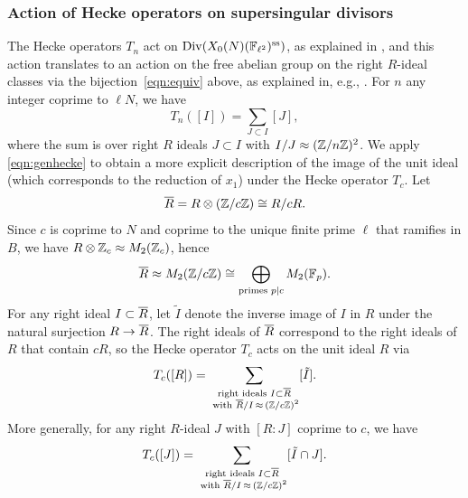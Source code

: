 \documentclass{article} \usepackage[active]{srcltx}
\DeclareMathOperator{\supersingular}{ss}
\renewcommand{\ss}{\supersingular}
\begin{document}
\subsubsection{Action of Hecke operators on supersingular divisors}\label{sec:heckeaction}
The Hecke operators $T_n$ act on $\Div(X_0(N)(\F_{\ell^2})^{\ss})$, as
explained in \cite[pg.~443--445]{ribet:modreps}, and this action
translates to an action on the free abelian group on the
right $R$-ideal classes via the bijection~\eqref{eqn:equiv} above, as
explained in, e.g., \cite[\S3.2]{kohel:hecke}.  For $n$
any integer coprime to $\ell N$, we have
\begin{equation}\label{eqn:genhecke}
  T_n([I]) = \sum_{J\subset I} [J],
\end{equation}
where the sum is over right $R$ ideals $J\subset I$ with
$I/J\approx(\mathbb{Z}/n\mathbb{Z})^2$.  We apply \eqref{eqn:genhecke} to obtain a
more explicit description of the image of the unit ideal (which
corresponds to the reduction of $x_1$) under the Hecke operator $T_c$.
Let
$$\overline{R} = R\otimes(\mathbb{Z}/c\mathbb{Z}) \cong R/c R.$$ 
Since $c$ is coprime to $N$ and coprime to the unique finite prime
$\ell$ that ramifies in $B$, we have $R\otimes\mathbb{Z}_c \approx M_2(\mathbb{Z}_c)$,
hence
$$\overline{R}\approx M_2(\mathbb{Z}/c\mathbb{Z})\cong \bigoplus_{\text{primes }p\mid c} M_2(\mathbb{F}_p).$$  
For any right ideal $I \subset \overline{R}$, let $\tilde{I}$ denote 
the inverse image of $I$ in $R$ under the natural surjection $R \to \overline{R}$.  
The right ideals of $\overline{R}$ correspond to the right ideals of $R$ that
contain $cR$, so the Hecke operator $T_c$ acts on the unit ideal $R$ via
\begin{equation}\label{eqn:heckeideal}
  T_c([R]) = \sum_{\substack{\text{right ideals }I\subset \overline{R}\\\text{ with }
\overline{R}/I\,\approx\, (\mathbb{Z}/c\mathbb{Z})^2}} [\tilde{I}].
\end{equation}
More generally, for any right $R$-ideal $J$ with $[R:J]$ coprime to $c$, 
we have 
$$
  T_c([J]) = \sum_{\substack{\text{right ideals }I\subset \overline{R}\\\text{ with }
\overline{R}/I\,\approx\, (\mathbb{Z}/c\mathbb{Z})^2}} [\tilde{I}\cap J].
$$
\end{document}
